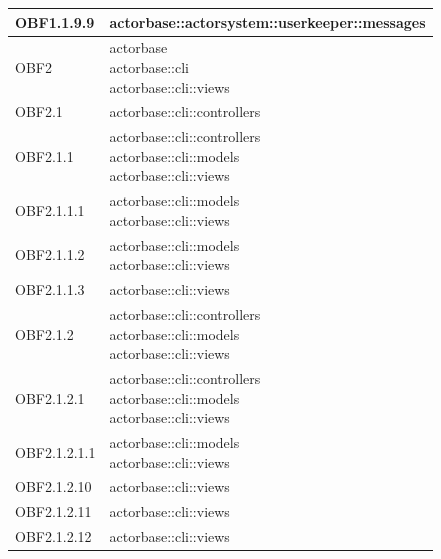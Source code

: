 \documentclass{scalatekids-article}
\begin{document}
\begin{longtable}[H]{|p{3.5cm}|p{7.5cm}|}
  \hline
  OBF1.1.9.9 & \multiLineCell[t]{actorbase::actorsystem::userkeeper::messages\\}\\
  \hline
  OBF2 & \multiLineCell[t]{actorbase\\actorbase::cli\\actorbase::cli::views\\}\\
  \hline
  OBF2.1 & \multiLineCell[t]{actorbase::cli::controllers\\}\\
  \hline
  OBF2.1.1 & \multiLineCell[t]{actorbase::cli::controllers\\actorbase::cli::models\\actorbase::cli::views\\}\\
  \hline
  OBF2.1.1.1 & \multiLineCell[t]{actorbase::cli::models\\actorbase::cli::views\\}\\
  \hline
  OBF2.1.1.2 & \multiLineCell[t]{actorbase::cli::models\\actorbase::cli::views\\}\\
  \hline
  OBF2.1.1.3 & \multiLineCell[t]{actorbase::cli::views\\}\\
  \hline
  OBF2.1.2 & \multiLineCell[t]{actorbase::cli::controllers\\actorbase::cli::models\\actorbase::cli::views\\}\\
  \hline
  OBF2.1.2.1 & \multiLineCell[t]{actorbase::cli::controllers\\actorbase::cli::models\\actorbase::cli::views\\}\\
  \hline
  OBF2.1.2.1.1 & \multiLineCell[t]{actorbase::cli::models\\actorbase::cli::views\\}\\
  \hline
  OBF2.1.2.10 & \multiLineCell[t]{actorbase::cli::views\\}\\
  \hline
  OBF2.1.2.11 & \multiLineCell[t]{actorbase::cli::views\\}\\
  \hline
  OBF2.1.2.12 & \multiLineCell[t]{actorbase::cli::views\\}\\

\end{longtable}
\end{document}
